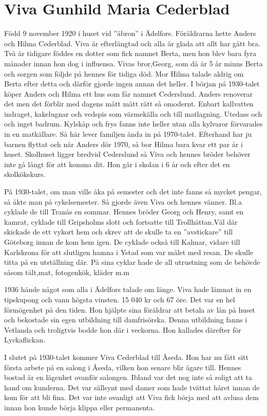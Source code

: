 \chapter{Viva Gunhild Maria Cederblad}
\label{viva_gunhild_maria_cederblad}
Född 9 november 1920 i huset vid ”åbron” i Ädelfors. Föräldrarna hette Anders och Hilma Cederblad. Viva är efterlängtad och alla är glada att allt har gått bra. Två år tidigare föddes en dotter som fick namnet Berta, men hon blev bara fyra månader innan hon dog i influensa. Vivas bror,Georg, som då är 5 år minns Berta och sorgen som följde på hennes för tidiga död. Mor Hilma talade aldrig om Berta efter detta och därför gjorde ingen annan det heller.
I början på 1930-talet köper Anders och Hilma ett hus som får namnet Cederslund.  Anders renoverar det men det förblir med dagens mått mätt rätt så omodernt. Enbart kallvatten indraget, kakelugnar och vedspis som värmekälla och till matlagning. Utedass och och inget badrum. Kylskåp och frys fanns inte heller utan alla kylvaror förvarades in en matkällare. Så här lever familjen ända in på 1970-talet. Efterhand har ju barnen flyttat och när Anders dör 1970, så bor Hilma bara kvar ett par år i huset.
Skolhuset ligger bredvid Cederslund så Viva och hennes bröder behöver inte gå långt för att komma dit. Hon går i skolan i 6 år och efter det en skolkökskurs.

På 1930-talet, om man ville åka på semester och det inte fanns så mycket pengar, så åkte man på cykelsemester. Så gjorde även Viva och hennes vänner. Bl.a cyklade de till Tranås en sommar. Hennes bröder Georg och Henry, samt en kamrat, cyklade till Gripsholms slott och fortsatte till Trollhättan.Väl där skickade de ett vykort hem och skrev att de skulle ta en ”avstickare” till Göteborg innan de kom hem igen. De cyklade också till Kalmar, vidare till Karlskrona för att slutligen hamna i Ystad som var målet med resan. De skulle titta på en utställning där.
På sina cyklar hade de all utrustning som de behövde såsom tält,mat, fotogenkök, kläder m.m

1936 hände något som alla i Ädelfors talade om länge. Viva hade lämnat in en tipskupong och vann högsta vinsten. 15 040 kr och 67 öre. Det var en hel förmögenhet på den tiden. Hon hjälpte sina föräldrar att betala av lån på huset och bekostade sin egen utbildning till damfrisörska. Denna utbildning fanns i Vetlanda och troligtvis bodde hon där i veckorna. Hon kallades därefter för Lyckaflickan.

I slutet på 1930-talet kommer Viva Cederblad till Åseda. Hon har nu fått sitt första arbete på en salong i Åseda, vilken hon senare blir ägare till. Hennes bostad är en lägenhet ovanför salongen. Ibland var det nog inte så roligt att ta hand om kunderna. Det var sällsynt med damer som hade tvättat håret innan de kom för att bli fina. Det var inte ovanligt att Viva fick börja med att avlusa dem innan hon kunde börja klippa eller permanenta.

